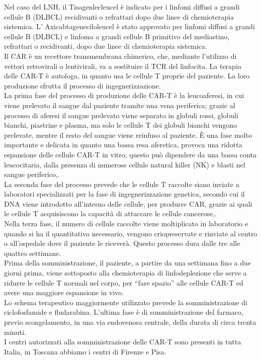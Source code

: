 Nel caso del LNH, il Tisagenlecleucel è indicato per i linfomi diffusi a grandi cellule B (DLBCL) recidivanti o 
refrattari dopo due linee di chemioterapia sistemica. L’ Axicabtageneciloleucel è stato approvato per linfomi 
diffusi a grandi cellule B (DLBCL) e linfoma a grandi cellule B primitivo del mediastino, 
refrattari o recidivanti, dopo due linee di chemioterapia sistemica\cite{EMATOCART}.\\
Il CAR è un recettore transmembrana chimerico, che, mediante l’utilizzo di vettori retrovirali o lentivirali, 
va a sostituire il TCR del linfocita.  
La terapia delle CAR-T è autologa, in quanto usa le cellule T proprie del paziente. La loro produzione sfrutta 
il processo di ingegnerizzazione.\\

La prima fase del processo di produzione delle CAR-T è la leucoaferesi, in cui viene prelevato il sangue dal 
paziente tramite una vena periferica; grazie al processo di aferesi il sangue prelevato viene separato in 
globuli rossi, globuli bianchi, piastrine e plasma, ma solo le cellule T dei globuli bianchi vengono prelevate, 
mentre il resto del sangue viene reinfuso al paziente. È una fase molto importante e delicata in quanto una bassa 
resa aferetica, provoca una ridotta espansione delle cellule CAR-T in vitro; questo può dipendere da una bassa conta 
leucocitaria, dalla presenza di numerose cellule natural killer (NK) e blasti nel sangue periferico\cite{EMATOCART},\cite{LLSCART}.\\
La seconda fase del processo prevede che le cellule T raccolte siano inviate a laboratori specializzati per la fase 
di ingegnerizzazione genetica, secondo cui il DNA viene introdotto all’interno delle cellule, per produrre CAR, 
grazie ai quali le cellule T acquisiscono la capacità di attaccare le cellule cancerose\cite{EMATOCART},\cite{LLSCART}.\\
Nella terza fase, il numero di cellule raccolte viene moltiplicato in laboratorio e quando si ha il quantitativo 
necessario, vengono criopreservate e rinviate al centro o all’ospedale dove il paziente le riceverà. 
Questo processo dura dalle tre alle quattro settimane.\\
Prima della somministrazione, il paziente, a partire da una settimana fino a due giorni prima, viene sottoposto 
alla chemioterapia di linfodeplezione che  serve a ridurre le cellule T normali nel corpo, per “fare spazio” alle 
cellule CAR-T ed avere una maggiore espansione in vivo.\\ 
Lo schema terapeutico maggiormente utilizzato prevede la somministrazione di ciclofosfamide e fludarabina.
L’ultima fase è di somministrazione del farmaco, previo scongelamento, in una via endovenosa centrale, 
della durata di circa trenta minuti\cite{EMATOCART}.\\
I centri autorizzati alla somministrazione delle CAR-T sono presenti in tutta Italia, in Toscana abbiamo 
i centri di Firenze e Pisa\cite{AILCENTRI}.\\

